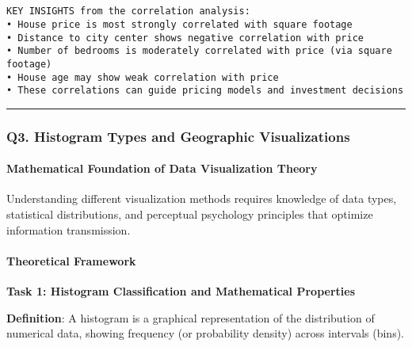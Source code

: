 \documentclass[11pt]{article}
\begin{document}
    \begin{center}
    \end{center}
    { \hspace*{\fill} \\}
    
    \begin{Verbatim}[commandchars=\\\{\}]

KEY INSIGHTS from the correlation analysis:
• House price is most strongly correlated with square footage
• Distance to city center shows negative correlation with price
• Number of bedrooms is moderately correlated with price (via square footage)
• House age may show weak correlation with price
• These correlations can guide pricing models and investment decisions
    \end{Verbatim}

    \begin{center}\rule{0.5\linewidth}{0.5pt}\end{center}

\subsubsection{Q3. Histogram Types and Geographic
Visualizations}\label{q3.-histogram-types-and-geographic-visualizations}

\paragraph{Mathematical Foundation of Data Visualization
Theory}\label{mathematical-foundation-of-data-visualization-theory}

Understanding different visualization methods requires knowledge of data
types, statistical distributions, and perceptual psychology principles
that optimize information transmission.

\paragraph{Theoretical Framework}\label{theoretical-framework}

\textbf{Task 1: Histogram Classification and Mathematical Properties}

\textbf{Definition}: A histogram is a graphical representation of the
distribution of numerical data, showing frequency (or probability
density) across intervals (bins).
\end{document}
